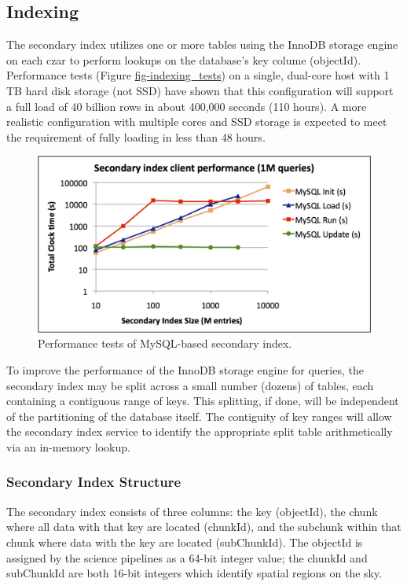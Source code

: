 \documentclass[DM,lsstdraft,toc]{lsstdoc}
\begin{document}
\subsection{Indexing}\label{indexing-1}

The secondary index utilizes one or more tables using the InnoDB storage
engine on each czar to perform lookups on the database's key colume
(objectId). Performance tests (Figure \href{}{fig-indexing\_tests}) on a
single, dual-core host with 1 TB hard disk storage (not SSD) have shown
that this configuration will support a full load of 40 billion rows in
about 400,000 seconds (110 hours). A more realistic configuration with
multiple cores and SSD storage is expected to meet the requirement of
fully loading in less than 48 hours.

\begin{figure}[H]
\centering
\includegraphics[width=\textwidth]{_static/indexing_tests.png}
\caption{Performance tests of MySQL-based secondary index.}
\end{figure}

To improve the performance of the InnoDB storage engine for queries, the
secondary index may be split across a small number (dozens) of tables,
each containing a contiguous range of keys. This splitting, if done,
will be independent of the partitioning of the database itself. The
contiguity of key ranges will allow the secondary index service to
identify the appropriate split table arithmetically via an in-memory
lookup.

\subsubsection{Secondary Index
Structure}\label{secondary-index-structure}

The secondary index consists of three columns: the key (objectId), the
chunk where all data with that key are located (chunkId), and the
subchunk within that chunk where data with the key are located
(subChunkId). The objectId is assigned by the science pipelines as a
64-bit integer value; the chunkId and subChunkId are both 16-bit
integers which identify spatial regions on the sky.
\end{document}

